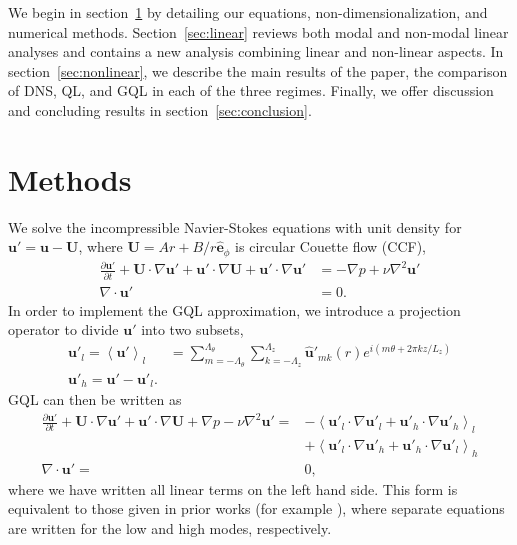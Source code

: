 \documentclass[openacc]{rstransa}%
\newcommand{\Reyn}{\mathrm{Re}}
\begin{document}
We begin in section~\ref{sec:methods} by detailing our equations, non-dimensionalization, and numerical methods. Section~\ref{sec:linear} reviews both modal and non-modal linear analyses and contains a new analysis combining linear and non-linear aspects. In section~\ref{sec:nonlinear}, we describe the main results of the paper, the comparison of DNS, QL, and GQL in each of the three regimes. Finally, we offer discussion and concluding results in section~\ref{sec:conclusion}.

\section{Methods}
\label{sec:methods}
We solve the incompressible Navier-Stokes equations with unit density for $\mathbf{u}' = \mathbf{u} - \mathbf{U}$,
where $\mathbf{U} = A r + B/r \hat{\mathbf{e}}_\phi$ is circular Couette flow (CCF),
\begin{align}
\label{eqn:NS}
      \frac{\partial \mathbf{u'}}{\partial t} + \mathbf{U} \cdot \nabla \mathbf{u'} + \mathbf{u'} \cdot \nabla \mathbf{U} + \mathbf{u'} \cdot \nabla \mathbf{u'} &= -\nabla p + \nu \nabla^2\mathbf{u'}\\
      \nabla \cdot \mathbf{u'} &= 0.
\end{align}
In order to implement the GQL approximation, we introduce a projection operator to divide $\mathbf{u'}$ into two subsets,
\begin{align}
    \mathbf{u'}_l = \left< \mathbf{u'}\right>_l &= \sum_{m = -\Lambda_\theta}^{\Lambda_\theta} \sum_{k = -\Lambda_z}^{\Lambda_z} \mathbf{\hat{u}'}_{mk}(r) e^{i (m \theta + 2\pi k z/L_z)}\\
    \mathbf{u'}_h = \mathbf{u'} - \mathbf{u'}_l.
\end{align}
GQL can then be written as 
\begin{align}
\label{eqn:GQL}
      \frac{\partial \mathbf{u'}}{\partial t} + \mathbf{U} \cdot \nabla \mathbf{u'} + \mathbf{u'} \cdot \nabla \mathbf{U} +\nabla p - \nu \nabla^2\mathbf{u'} = &- \left<\mathbf{u'}_l \cdot \nabla \mathbf{u'}_l +\mathbf{u'}_h \cdot \nabla \mathbf{u'}_h\right>_l\\
      & +\left<\mathbf{u'}_l \cdot \nabla \mathbf{u'}_h + \mathbf{u'}_h \cdot \nabla \mathbf{u'}_l \right>_h\\
      \nabla \cdot \mathbf{u'} = & 0,
\end{align}
where we have written all linear terms on the left hand side. This form is equivalent to those given in prior works (for example \cite{2017JFM...810..412T}), where separate equations are written for the low and high modes, respectively.
\end{document}

